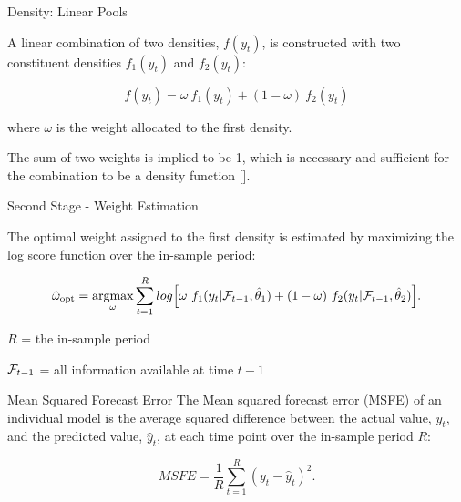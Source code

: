 \begin{frame}{Density: Linear Pools}
		
        A linear combination of two densities, $f(y_t)$, is constructed with two constituent densities $f_1(y_t)$ and $f_2(y_t)$:
        
        \vspace{3mm}
        
        \begin{equation}
        f(y_t) = \omega \ f_1(y_t) + (1-\omega) \ f_2(y_t)
        \end{equation}  
        
        \vspace{3mm}
        
        where $\omega$ is the weight allocated to the first density.

        \vspace{2mm}

        \small{The sum of two weights is implied to be 1, which is necessary and sufficient for the combination to be a density function [\cite{GA11}].}
        
\end{frame}



\begin{frame}{Second Stage - Weight Estimation}

    The optimal weight assigned to the first density is estimated by maximizing the log score function over the in-sample period:

    \begin{equation}
    \hat{\omega}_{\text{opt}} = \underset{\omega}{\text{argmax}} \sum^R_{t=1}log \Big[\omega \ f_1(y_t |\mathcal{F}_{\small{t-1}}, \hat\theta_1) + (1-\omega) \ f_2(y_t|\mathcal{F}_{\small{t-1}}, \hat\theta_2)\Big].
    \end{equation}

    \begin{itemize}
    \small{
    \item $R$ = the in-sample period
    \item $\mathcal{F}_{\small{t-1}}$ = all information available at time $t-1$
    }
    \end{itemize}

\end{frame}



\begin{frame}{Mean Squared Forecast Error}
    The Mean squared forecast error (MSFE) of an individual model is the average squared difference between the actual value, $y_t$, and the predicted value, $\hat y_t$, at each time point over the in-sample period $R$:

    \begin{equation}
    \label{eqn:MSFE1}
    MSFE = \frac{1}{R} \sum^R_{t=1} (y_t - \hat y_t)^2.
    \end{equation}  

\end{frame}



